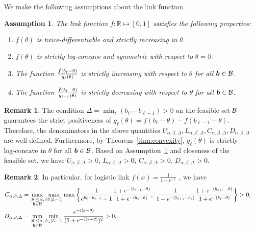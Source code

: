 \documentclass[11pt]{article}
\theoremstyle{plain}
\newtheorem{assumption}{Assumption}
\theoremstyle{definition}
\newtheorem{rmk}{Remark}
\begin{document}
We make the following assumptions about the link function.
\begin{assumption}\label{ass:joint}
The link function $f\colon \mathbb{R}\mapsto [0,1]$ satisfies the following properties:
\begin{enumerate}
\item $f(\theta)$ is twice-differentiable and strictly increasing in $\theta$.
\item $\dot{f}(\theta)$ is strictly log-concave and symmetric with respect to $\theta=0$.
\item The function ${\dot{f}(b_\ell-\theta)\over g_\ell(\theta)}$ is strictly increasing with respect to $\theta$ for all $\bm{b}\in\mathcal{B}$.
\item The function ${\dot{f}(b_\ell-\theta)\over g_{\ell+1}(\theta)}$ is strictly decreasing with respect to $\theta$ for all $\bm{b}\in\mathcal{B}$.
\end{enumerate}
\end{assumption}

\begin{rmk}
The condition $\Delta=\min_{\ell}(b_{\ell}-b_{\ell-1})>0$ on the feasible set $\mathcal{B}$ guarantees the strict positiveness of $g_{\ell}(\theta)=f(b_{\ell}-\theta)-f(b_{\ell-1}-\theta)$. Therefore, the denominators in the above quantities $U_{\alpha,\beta,\Delta}, L_{\alpha,\beta,\Delta}, C_{\alpha,\beta,\Delta}, D_{\alpha,\beta,\Delta}$ are well-defined. Furthermore, by Theorem~\ref{thm:convexity}, $g_\ell(\theta)$ is strictly log-concave in $\theta$ for all $\bm{b}\in\mathcal{B}$. Based on Assumption~\ref{ass:joint} and closeness of the feasible set, we have $U_{\alpha,\beta,\Delta}>0$, $L_{\alpha,\beta,\Delta}>0$, $C_{\alpha,\beta,\Delta}>0$, $D_{\alpha,\beta,\Delta}>0$.
\end{rmk}
\begin{rmk}
In particular, for logistic link $f(x) = \frac{1}{1+e^{-x}}$ , we have
\begin{align}
C_{\alpha,\beta,\Delta}&=\max_{\substack{|\theta|\leq \alpha,\\ \bm{b}\in\mathcal{B}}}\max_{\ell\in[L-1]}\max
\left\{
{ 1\over e^{b_{\ell}-b_{\ell-1}}-1} { 1+e^{-(b_{\ell-1}-\theta)} \over 1+e^{-(b_{\ell}-\theta)}},\
{ 1\over 1-e^{-(b_{\ell+1}-b_{\ell})}} { 1+e^{-(b_{\ell+1}-\theta)} \over 1+e^{-(b_{\ell}-\theta)}}
\right\}>0,
\\
D_{\alpha,\beta,\Delta}&=\min_{\substack{|\theta|\leq \alpha,\\ \bm{b}\in\mathcal{B}}}\min_{\ell\in[L-1]} {e^{-(b_\ell-\theta)}\over (1+e^{-(b_\ell-\theta)})^2}>0.
\end{align}
\end{rmk}
\end{document}
